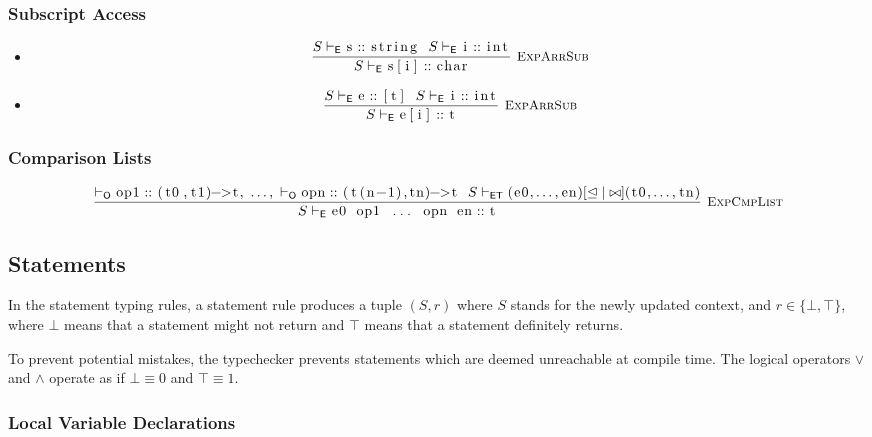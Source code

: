 \documentclass{article}
\newcommand{\code}[1]{\lstinline[columns=fixed]{#1}}
\newcommand{\drmrule}[5]{\frac{#1}{#2\vdash_{\mathsf{#3}}#4}\textsc{\ \small{#5}}}
\newcommand{\ruleapp}[1]{\vdash_{\mathsf{#1}}}
\newcommand{\mc}[1]{\textnormal{\code{#1}}}
\begin{document}
			\subsubsection{Subscript Access}
			
				\begin{itemize}
					\item
						\begin{align*}
							\drmrule{S\ruleapp{E}\mc{s}::\mc{string}\ \ S\ruleapp{E}\mc{i}::\mc{int}}{S}{E}{\mc{s[i]} :: \mc{char}}{ExpArrSub}
						\end{align*}
					\item
						\begin{align*}
							\drmrule{S\ruleapp{E}\mc{e}::\mc{[t]}\ \ S\ruleapp{E}\mc{i}::\mc{int}}{S}{E}{\mc{e[i]} :: \mc{t}}{ExpArrSub}
						\end{align*}
				\end{itemize}
			
			\subsubsection{Comparison Lists}
			
				\begin{align*}
					\drmrule{\ruleapp{O}\mc{op1}::\mc{(t0,t1)->t},\ \dots,\ \ruleapp{O}\mc{opn}::\mc{(t(n-1),tn)->t}\ \ S\ruleapp{ET} (\mc{e0},\dots,\mc{en}) [\trianglelefteq|\bowtie] (\mc{t0},\dots,\mc{tn})}{S}{E}{\mc{e0 op1 ... opn en} :: \mc{t}}{ExpCmpList}
				\end{align*}
				
		\subsection{Statements}
		
			In the statement typing rules, a statement rule produces a tuple $(S,r)$ where $S$ stands for the newly updated context, and $r\in\{\bot,\top\}$, where $\bot$ means that a statement might not return and $\top$ means that a statement definitely returns.
			
			To prevent potential mistakes, the typechecker prevents statements which are deemed unreachable at compile time. The logical operators $\vee$ and $\wedge$ operate as if $\bot\equiv0$ and $\top\equiv1$.
		
			\subsubsection{Local Variable Declarations}
			
\end{document}
